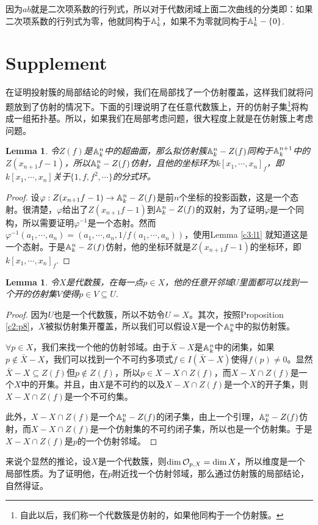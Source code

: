 \documentclass[9pt]{extarticle}
\theoremstyle{plain}%
\newtheorem{lem}[defi]{Lemma}%
\begin{document}
因为$ab$就是二次项系数的行列式，所以对于代数闭域上面二次曲线的分类即：如果二次项系数的行列式为零，他就同构于$\mathbb{A}^1_k$，如果不为零就同构于$\mathbb{A}^1_k-\{0\}$.

\section*{Supplement}
在证明投射簇的局部结论的时候，我们在局部找了一个仿射覆盖，这样我们就将问题放到了仿射的情况下。下面的引理说明了在任意代数簇上，开的仿射子集\footnote{自此以后，我们称一个代数簇是仿射的，如果他同构于一个仿射簇。}将构成一组拓扑基。所以，如果我们在局部考虑问题，很大程度上就是在仿射簇上考虑问题。
\begin{lem}
	令$Z(f)$是$\mathbb{A}^n_k$中的超曲面，那么拟仿射簇$\mathbb{A}^n_k-Z(f)$同构于$\mathbb{A}^{n+1}_{k}$中的$Z(x_{n+1}f-1)$，所以$\mathbb{A}^n_k-Z(f)$仿射，且他的坐标环为$k[x_1,\cdots,x_n]_f$，即$k[x_1,\cdots,x_n]$关于$\{1,f,f^2,\cdots\}$的分式环。
\end{lem}
\begin{proof}
	设$\varphi:Z(x_{n+1}f-1)\to \mathbb{A}^n_k-Z(f)$是前$n$个坐标的投影函数，这是一个态射。很清楚，$\varphi$给出了$Z(x_{n+1}f-1)$到$\mathbb{A}^n_k-Z(f)$的双射，为了证明$\varphi$是一个同构，所以需要证明$\varphi^{-1}$是一个态射。然而$\varphi^{-1}(a_1,\cdots,a_n)=(a_1,\cdots,a_n,1/f(a_1,\cdots,a_n))$，使用Lemma \ref{c3:l1} 就知道这是一个态射。于是$\mathbb{A}^n_k-Z(f)$仿射，他的坐标环就是$Z(x_{n+1}f-1)$的坐标环，即$k[x_1,\cdots,x_n]_f$.
\end{proof}

\begin{lem}
	令$X$是代数簇，在每一点$p\in X$，他的任意开邻域$U$里面都可以找到一个开的仿射集$V$使得$p\in V\subseteq U$.
\end{lem}
\begin{proof}
	因为$U$也是一个代数簇，所以不妨令$U=X$。其次，按照Proposition \ref{c2:p8}，$X$被拟仿射集开覆盖，所以我们可以假设$X$是一个$\mathbb{A}^n_k$中的拟仿射簇。

	$\forall p\in X$，我们来找一个他的仿射邻域。由于$\bar{X}-X$是$\mathbb{A}^n_k$中的闭集，如果$p\notin \bar{X}-X$，我们可以找到一个不可约多项式$f\in I(\bar{X}-X)$使得$f(p)\neq 0$。显然$\bar{X}-X\subseteq Z(f)$但$p\notin Z(f)$，所以$p\in X-X\cap Z(f)$，而$X-X\cap Z(f)$是一个$X$中的开集。并且，由$X$是不可约的以及$X-X\cap Z(f)$是一个$X$的开子集，则$X-X\cap Z(f)$是一个不可约集。

	此外，$X-X\cap Z(f)$是一个$\mathbb{A}^n_k-Z(f)$的闭子集，由上一个引理，$\mathbb{A}^n_k-Z(f)$仿射，而$X-X\cap Z(f)$是一个仿射集的不可约闭子集，所以也是一个仿射集。于是$X-X\cap Z(f)$是$p$的一个仿射邻域。
\end{proof}
来说个显然的推论，设$X$是一个代数簇，则$\dim \mathcal{O}_{p,X}=\dim X$，所以维度是一个局部性质。为了证明他，在$p$附近找一个仿射邻域，那么通过仿射簇的局部结论，自然得证。
\end{document}
